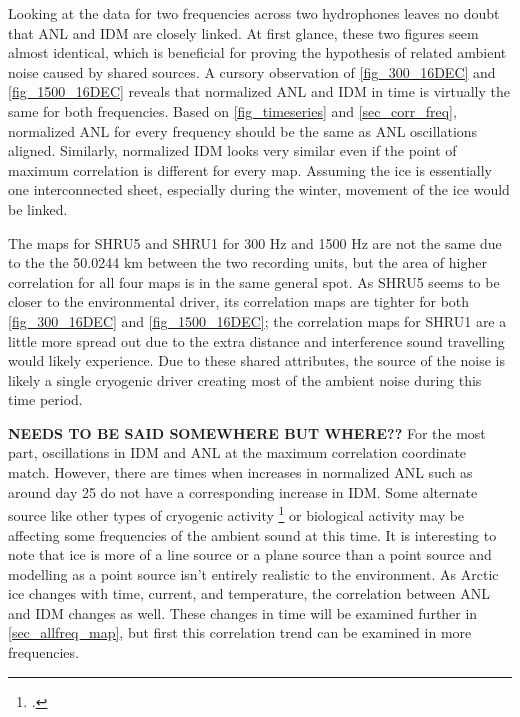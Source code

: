 Looking at the data for two frequencies across two hydrophones leaves no doubt that ANL and IDM are closely linked. At first glance, these two figures seem almost identical, which is beneficial for proving the hypothesis of related ambient noise caused by shared sources. A cursory observation of \autoref{fig_300_16DEC} and \autoref{fig_1500_16DEC} reveals that normalized ANL and IDM in time is virtually the same for both frequencies. Based on \autoref{fig_timeseries} and \autoref{sec_corr_freq}, normalized ANL for every frequency should be the same as ANL oscillations aligned. Similarly, normalized IDM looks very similar even if the point of maximum correlation is different for every map. Assuming the ice is essentially one interconnected sheet, especially during the winter, movement of the ice would be linked.  


The maps for SHRU5 and SHRU1 for 300 Hz and 1500 Hz are not the same due to the the 50.0244 km between the two recording units, but the area of higher correlation for all four maps is in the same general spot. As SHRU5 seems to be closer to the environmental driver, its correlation maps are tighter for both \autoref{fig_300_16DEC} and \autoref{fig_1500_16DEC}; the correlation maps for SHRU1 are a little more spread out due to the extra distance and interference sound travelling would likely experience. Due to these shared attributes, the source of the noise is likely a single cryogenic driver creating most of the ambient noise during this time period. 

\textbf{NEEDS TO BE SAID SOMEWHERE BUT WHERE??} For the most part, oscillations in IDM and ANL at the maximum correlation coordinate match. However, there are times when increases in normalized ANL such as around day 25 do not have a corresponding increase in IDM. Some alternate source like other types of cryogenic activity \footcite[]{collins2019acoustic} or biological activity may be affecting some frequencies of the ambient sound at this time. It is interesting to note that ice is more of a line source or a plane source than a point source and modelling as a point source isn't entirely realistic to the environment. As Arctic ice changes with time, current, and temperature, the correlation between ANL and IDM changes as well. These changes in time will be examined further in \autoref{sec_allfreq_map}, but first this correlation trend can be examined in more frequencies.


